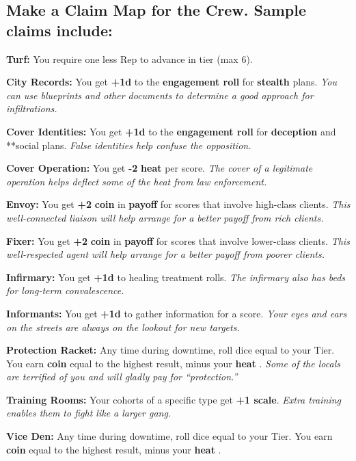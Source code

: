 \documentclass[11pt,fleqn,a5paper]{book}
\newcommand{\gameterm}[1]{\textbf{#1}}
\begin{document}
\subsection{Make a Claim Map for the Crew. Sample claims include:}

\gameterm{Turf: } You require one less Rep to advance in tier (max 6).

\gameterm{City Records:}  You get \textbf{+1d} to the \textbf{engagement roll} for \textbf{stealth} plans. \emph{You can use blueprints and other documents to determine a good approach for infiltrations.}

\gameterm{Cover Identities: }  You get \textbf{+1d} to the \textbf{engagement roll} for \textbf{deception} and **social plans. \emph{False identities help confuse the opposition.}

\gameterm{Cover Operation: }  You get \textbf{-2} \gameterm{heat}  per score. \emph{The cover of a legitimate operation helps deflect some of the heat from law enforcement.}

\gameterm{Envoy:}  You get \textbf{+2} \gameterm{coin}  in \textbf{payoff} for scores that involve high-class clients. \emph{This well-connected liaison will help arrange for a better payoff from rich clients.}

\gameterm{Fixer:}  You get \textbf{+2} \gameterm{coin}  in \textbf{payoff} for scores that involve lower-class clients. \emph{This well-respected agent will help arrange for a better payoff from poorer clients.}

\gameterm{Infirmary:}  You get \textbf{+1d} to healing treatment rolls. \emph{The infirmary also has beds for long-term convalescence.}

\gameterm{Informants:}  You get \textbf{+1d} to gather information for a score. \emph{Your eyes and ears on the streets are always on the lookout for new targets.}

\gameterm{Protection Racket:}  Any time during downtime, roll dice equal to your Tier. You earn \gameterm{coin}  equal to the highest result, minus your \gameterm{heat} . \emph{Some of the locals are terrified of you and will gladly pay for “protection.”}

\gameterm{Training Rooms:}  Your cohorts of a specific type get \textbf{+1 scale}. \emph{Extra training enables them to fight like a larger gang.}

\gameterm{Vice Den:}  Any time during downtime, roll dice equal to your Tier. You earn \gameterm{coin}  equal to the highest result, minus your \gameterm{heat} .
\end{document}
